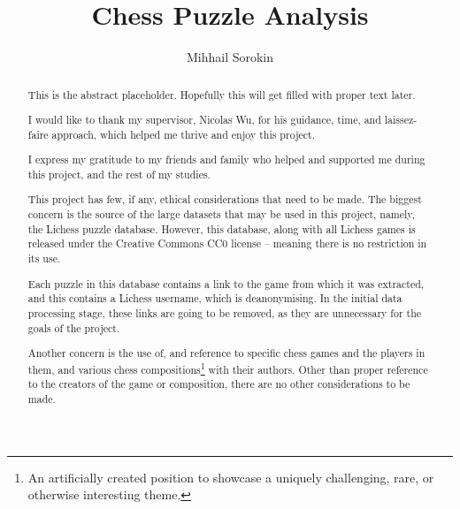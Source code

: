 \documentclass[a4paper, twoside]{report}
\title{Chess Puzzle Analysis}
\author{Mihhail Sorokin}
\begin{document}



\begin{abstract}

  This is the abstract placeholder. Hopefully this will get filled with
  proper text later.

\end{abstract}

\renewcommand{\abstractname}{Acknowledgements}
\begin{abstract}

  I would like to thank my supervisor, Nicolas Wu, for his guidance, time, and
  laissez-faire approach, which helped me thrive and enjoy this project.

  I express my gratitude to my friends and family who helped and supported
  me during this project, and the rest of my studies. 

\end{abstract}

\renewcommand{\abstractname}{Ethical Discussion}
\begin{abstract}

  This project has few, if any, ethical considerations that need to be made.
  The biggest concern is the source of the large datasets that may be used in
  this project, namely, the Lichess puzzle database. However, this database,
  along with all Lichess games is released under the Creative Commons CC0
  license -- meaning there is no restriction in its use.

  Each puzzle in this database contains a link to the game from which it was
  extracted, and this contains a Lichess username, which is deanonymising. In
  the initial data processing stage, these links are going to be removed, as
  they are unnecessary for the goals of the project.

  Another concern is the use of, and reference to specific chess games and
  the players in them, and various chess compositions\footnote{An
  artificially created position to showcase a uniquely challenging, rare, or
  otherwise interesting theme.} with their authors. Other than proper
  reference to the creators of the game or composition, there are no other
  considerations to be made.

\end{abstract}

\tableofcontents






%



\end{document}
